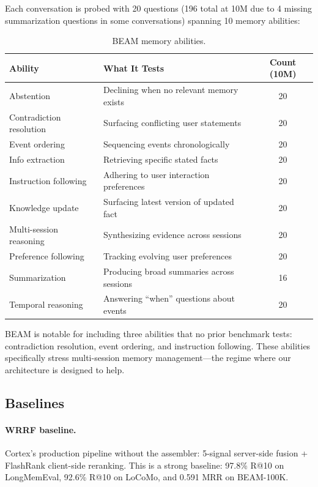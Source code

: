 \documentclass[11pt]{article}
\begin{document}
Each conversation is probed with 20 questions (196 total at 10M due
to 4 missing summarization questions in some conversations) spanning
10 memory abilities:

\begin{table}[h]
\centering
\caption{BEAM memory abilities.}
\label{tab:beam-abilities}
\small
\begin{tabular}{llc}
\toprule
Ability & What It Tests & Count (10M) \\
\midrule
Abstention & Declining when no relevant memory exists & 20 \\
Contradiction resolution & Surfacing conflicting user statements & 20 \\
Event ordering & Sequencing events chronologically & 20 \\
Info extraction & Retrieving specific stated facts & 20 \\
Instruction following & Adhering to user interaction preferences & 20 \\
Knowledge update & Surfacing latest version of updated fact & 20 \\
Multi-session reasoning & Synthesizing evidence across sessions & 20 \\
Preference following & Tracking evolving user preferences & 20 \\
Summarization & Producing broad summaries across sessions & 16 \\
Temporal reasoning & Answering ``when'' questions about events & 20 \\
\bottomrule
\end{tabular}
\end{table}

BEAM is notable for including three abilities that no prior benchmark
tests: contradiction resolution, event ordering, and instruction
following.  These abilities specifically stress multi-session memory
management---the regime where our architecture is designed to help.

\subsection{Baselines}
\label{sec:baselines}

\paragraph{WRRF baseline.}
Cortex's production pipeline without the assembler: 5-signal
server-side fusion + FlashRank client-side reranking.  This is a
strong baseline: 97.8\% R@10 on LongMemEval, 92.6\% R@10 on LoCoMo,
and 0.591 MRR on BEAM-100K.
\end{document}
